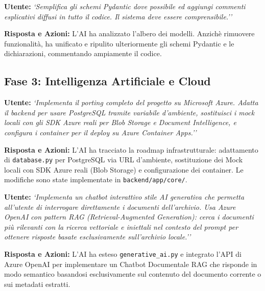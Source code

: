 \documentclass[12pt,a4paper,oneside]{report}
\begin{document}
\begin{promptbox}[title={Prompt 6 --- Semplificazione Schemi e Documentazione Codice}]
\textbf{Utente:} \textit{`Semplifica gli schemi Pydantic dove possibile ed aggiungi commenti esplicativi diffusi in tutto il codice. Il sistema deve essere comprensibile.''}

\textbf{Risposta e Azioni:} L'AI ha analizzato l'albero dei modelli. Anzich\`{e} rimuovere funzionalit\`{a}, ha unificato e ripulito ulteriormente gli schemi Pydantic e le dichiarazioni, commentando ampiamente il codice.
\end{promptbox}

\subsection{Fase 3: Intelligenza Artificiale e Cloud}

\begin{promptbox}[title={Prompt 7 --- Porting su Cloud Azure}]
\textbf{Utente:} \textit{`Implementa il porting completo del progetto su Microsoft Azure. Adatta il backend per usare PostgreSQL tramite variabile d'ambiente, sostituisci i mock locali con gli SDK Azure reali per Blob Storage e Document Intelligence, e configura i container per il deploy su Azure Container Apps.''}

\textbf{Risposta e Azioni:} L'AI ha tracciato la roadmap infrastrutturale: adattamento di \texttt{database.py} per PostgreSQL via URL d'ambiente, sostituzione dei Mock locali con SDK Azure reali (Blob Storage) e configurazione dei container. Le modifiche sono state implementate in \texttt{backend/app/core/}.
\end{promptbox}

\begin{promptbox}[title={Prompt 8 --- Chatbot RAG per interrogazione Atti}]
\textbf{Utente:} \textit{`Implementa un chatbot interattivo stile AI generativa che permetta all'utente di interrogare direttamente i documenti dell'archivio. Usa Azure OpenAI con pattern RAG (Retrieval-Augmented Generation): cerca i documenti più rilevanti con la ricerca vettoriale e iniettali nel contesto del prompt per ottenere risposte basate esclusivamente sull'archivio locale.''}

\textbf{Risposta e Azioni:} L'AI ha esteso \texttt{generative\_ai.py} e integrato l'API di Azure OpenAI per implementare un Chatbot Documentale RAG che risponde in modo semantico basandosi esclusivamente sul contenuto del documento corrente o sui metadati estratti.
\end{promptbox}
\end{document}
